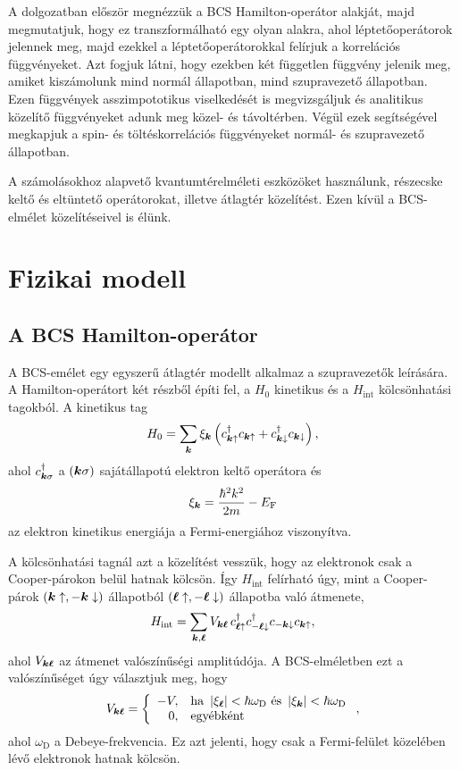 \documentclass[a4paper,12pt,titlepage]{article}
\newcommand{\KK}{{\vb*{k}}}
\newcommand{\LL}{{\vb*{\ell}}}
\newcommand{\EF}{{E_\text{F}}}
\begin{document}
A dolgozatban először megnézzük a BCS Hamilton-operátor alakját, majd megmutatjuk, hogy ez transzformálható egy olyan alakra, ahol léptetőoperátorok jelennek meg, majd ezekkel a léptetőoperátorokkal felírjuk a korrelációs függvényeket.  Azt fogjuk látni, hogy ezekben két független függvény jelenik meg, amiket kiszámolunk mind normál állapotban, mind szupravezető állapotban.  Ezen függvények asszimpototikus viselkedését is megvizsgáljuk és analitikus közelítő függvényeket adunk meg közel- és távoltérben.  Végül ezek segítségével megkapjuk a spin- és töltéskorrelációs függvényeket normál- és szupravezető állapotban.

A számolásokhoz alapvető kvantumtérelméleti eszközöket használunk, részecske keltő és eltüntető operátorokat, illetve átlagtér közelítést.  Ezen kívül a BCS-elmélet közelítéseivel is élünk.



\section{Fizikai modell}

\subsection{A BCS Hamilton-operátor}

A BCS-emélet egy egyszerű átlagtér modellt alkalmaz a szupravezetők leírására.  A Hamilton-operátort két részből építi fel, a $H_0$ kinetikus és a $H_\text{int}$ kölcsönhatási tagokból.  A kinetikus tag
\begin{equation}
	H_0 = \sum\limits_\KK \xi_\KK \left( c_{\KK \uparrow}^\dagger c_{\KK \uparrow} + c_{\KK \downarrow}^\dagger c_{\KK \downarrow} \right),
\end{equation}
ahol $c_{\KK \sigma}^\dagger$ a $\left( \KK \sigma \right)$ sajátállapotú elektron keltő operátora és
$$ \xi_\KK = \frac{\hbar^2 k^2}{2 m} - \EF $$
az elektron kinetikus energiája a Fermi-energiához viszonyítva.

A kölcsönhatási tagnál azt a közelítést vesszük, hogy az elektronok csak a Cooper-párokon belül hatnak kölcsön.  Így $H_\text{int}$ felírható úgy, mint a Cooper-párok $\left( \KK \uparrow, -\KK \downarrow \right)$ állapotból $\left( \LL \uparrow, -\LL \downarrow \right)$ állapotba való átmenete,
\begin{equation} \label{H-int-def}
	H_\text{int} = \sum\limits_{\KK, \LL} V_{\KK \LL} \, c_{\LL \uparrow}^\dagger c_{-\LL \downarrow}^\dagger c_{-\KK \downarrow} c_{\KK \uparrow},
\end{equation}
ahol $V_{\KK \LL}$ az átmenet valószínűségi amplitúdója.  A BCS-elméletben ezt a valószínűséget úgy választjuk meg, hogy
$$ V_{\KK \LL} = \left\{ \begin{array}{rl}
	-V, & \text{ha } \left| \xi_\LL \right| < \hbar \omega_\text{D} \text{ és } \left| \xi_\KK \right| < \hbar \omega_\text{D} \\
	0, & \text{egyébként}
\end{array} \right. , $$
ahol $\omega_\text{D}$ a Debeye-frekvencia.  Ez azt jelenti, hogy csak a Fermi-felület közelében lévő elektronok hatnak kölcsön.
\end{document}
